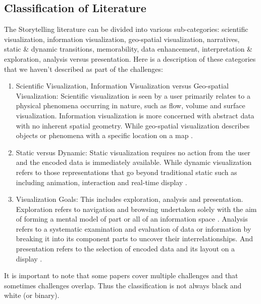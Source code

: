 \documentclass{egpubl}
\begin{document}
\subsection{Classification of Literature}
The Storytelling literature can be divided into various sub-categories: scientific visualization, information visualization, geo-spatial visualization, narratives, static \& dynamic transitions, memorability, data enhancement, interpretation \& exploration, analysis versus presentation. Here is a description of these categories that we haven't described as part of the challenges:
\begin{enumerate}
	\item Scientific Visualization, Information Visualization versus Geo-spatial Visualization: Scientific visualization is seen by a user primarily relates to a physical phenomena occurring in nature, such as flow, volume and surface visualization. Information visualization is more concerned with abstract data with no inherent spatial geometry. While geo-spatial visualization describes objects or phenomena with a specific location on a map \cite{spence2007}.
	\item Static versus Dynamic: Static visualization requires no action from the user and the encoded data is immediately available. While dynamic visualization refers to those representations that go beyond traditional static such as including animation, interaction and real-time display \cite{spence2007}.
	\item Visualization Goals: This includes exploration, analysis and presentation. Exploration refers to navigation and browsing undertaken solely with the aim of forming a mental model of part or all of an information space \cite{spence2007}. Analysis refers to a systematic examination and evaluation of data or information by breaking it into its component parts to uncover their interrelationships. And presentation refers to the selection of encoded data and its layout on a display \cite{spence2007}.
\end{enumerate}

It is important to note that some papers cover multiple challenges and that sometimes challenges overlap. Thus the classification is not always black and white (or binary).
\end{document}
